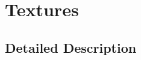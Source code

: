 \hypertarget{group____texture}{\section{Textures}
\label{group____texture}
}


\subsection{Detailed Description}
